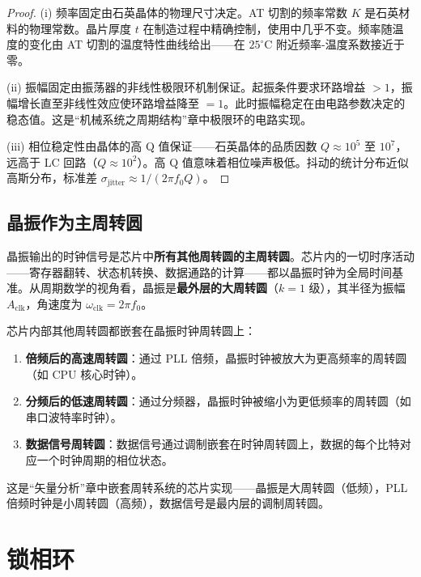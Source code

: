 \begin{proof}
(i) 频率固定由石英晶体的物理尺寸决定。AT 切割的频率常数 $K$ 是石英材料的物理常数。晶片厚度 $t$ 在制造过程中精确控制，使用中几乎不变。频率随温度的变化由 AT 切割的温度特性曲线给出——在 $25^\circ$C 附近频率-温度系数接近于零。

(ii) 振幅固定由振荡器的非线性极限环机制保证。起振条件要求环路增益 $> 1$，振幅增长直至非线性效应使环路增益降至 $= 1$。此时振幅稳定在由电路参数决定的稳态值。这是“机械系统之周期结构”章中极限环的电路实现。

(iii) 相位稳定性由晶体的高 Q 值保证——石英晶体的品质因数 $Q \approx 10^5$ 至 $10^7$，远高于 LC 回路（$Q \approx 10^2$）。高 Q 值意味着相位噪声极低。抖动的统计分布近似高斯分布，标准差 $\sigma_{\text{jitter}} \approx 1/(2\pi f_0 Q)$。
\end{proof}

\subsection{晶振作为主周转圆}

\begin{definition}[晶振的主周转圆地位]\label{def:quartz_master_epicycle}
晶振输出的时钟信号是芯片中\textbf{所有其他周转圆的主周转圆}。芯片内的一切时序活动——寄存器翻转、状态机转换、数据通路的计算——都以晶振时钟为全局时间基准。从周期数学的视角看，晶振是\textbf{最外层的大周转圆}（$k=1$ 级），其半径为振幅 $A_{\text{clk}}$，角速度为 $\omega_{\text{clk}} = 2\pi f_0$。

芯片内部其他周转圆都嵌套在晶振时钟周转圆上：
\begin{enumerate}[label=(\roman*)]
    \item \textbf{倍频后的高速周转圆}：通过 PLL 倍频，晶振时钟被放大为更高频率的周转圆（如 CPU 核心时钟）。
    \item \textbf{分频后的低速周转圆}：通过分频器，晶振时钟被缩小为更低频率的周转圆（如串口波特率时钟）。
    \item \textbf{数据信号周转圆}：数据信号通过调制嵌套在时钟周转圆上，数据的每个比特对应一个时钟周期的相位状态。
\end{enumerate}
这是“矢量分析”章中嵌套周转系统的芯片实现——晶振是大周转圆（低频），PLL 倍频时钟是小周转圆（高频），数据信号是最内层的调制周转圆。
\end{definition}

\section{锁相环}

